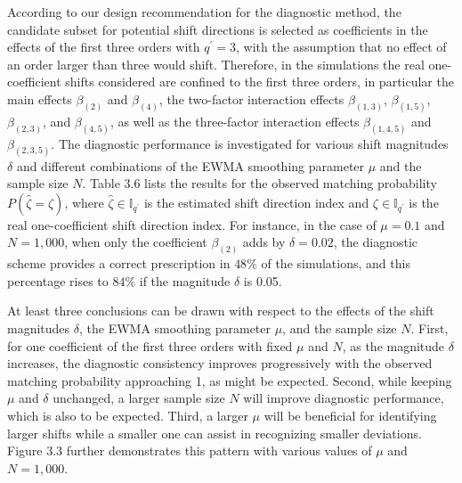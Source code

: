 According to our design recommendation for the diagnostic method, the candidate
subset for potential shift directions is selected as coefficients in the effects of
the first three orders with $q^{\prime}=3$, with the assumption that no effect of an
order larger than three would shift. Therefore, in the simulations the real
one-coefficient shifts considered are confined to the first three orders, in
particular the main effects $\beta_{(2)}$ and $\beta_{(4)}$, the two-factor
interaction effects $\beta_{(1,3)}$, $\beta_{(1,5)}$, $\beta_{(2,3)}$, and
$\beta_{(4,5)}$, as well as the three-factor interaction effects $\beta_{(1,4,5)}$
and $\beta_{(2,3,5)}$. The diagnostic performance is investigated for various shift
magnitudes $\delta$ and different combinations of the EWMA smoothing parameter $\mu$
and the sample size $N$. Table 3.6 lists the results for the observed matching
probability $P(\hat{\zeta}=\zeta)$, where $\hat{\zeta}\in\mathbb{I}_{q^{\prime}}$ is
the estimated shift direction index and $\zeta\in\mathbb{I}_{q^{\prime}}$ is the
real one-coefficient shift direction index. For instance, in the case of $\mu=0.1$
and $N=1,000$, when only the coefficient $\beta_{(2)}$ adds by $\delta=0.02$, the
diagnostic scheme provides a correct prescription in $48\%$ of the simulations, and
this percentage rises to $84\%$ if the magnitude $\delta$ is 0.05.

At least three conclusions can be drawn with respect to the effects of the shift
magnitudes $\delta$, the EWMA smoothing parameter $\mu$, and the sample size $N$.
First, for one coefficient of the first three orders with fixed $\mu$ and $N$, as
the magnitude $\delta$ increases, the diagnostic consistency improves progressively
with the observed matching probability approaching 1, as might be expected. Second,
while keeping $\mu$ and $\delta$ unchanged, a larger sample size $N$ will improve
diagnostic performance, which is also to be expected. Third, a larger $\mu$ will be
beneficial for identifying larger shifts while a smaller one can assist in
recognizing smaller deviations. Figure 3.3 further demonstrates this pattern with
various values of $\mu$ and $N=1,000$.

